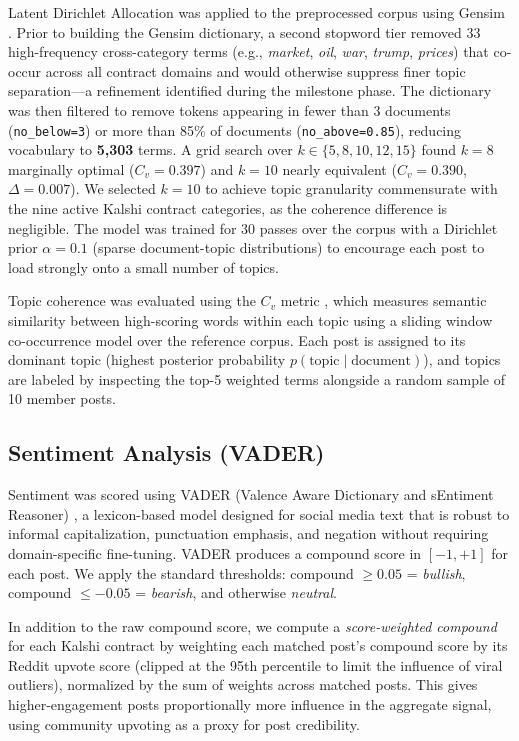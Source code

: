 \documentclass[sigconf]{acmart}
\begin{document}
Latent Dirichlet Allocation was applied to the preprocessed corpus using Gensim \cite{rehurek2010gensim}. Prior to building the Gensim dictionary, a second stopword tier removed 33 high-frequency cross-category terms (e.g., \textit{market}, \textit{oil}, \textit{war}, \textit{trump}, \textit{prices}) that co-occur across all contract domains and would otherwise suppress finer topic separation---a refinement identified during the milestone phase. The dictionary was then filtered to remove tokens appearing in fewer than 3 documents (\texttt{no\_below=3}) or more than 85\% of documents (\texttt{no\_above=0.85}), reducing vocabulary to \textbf{5,303} terms. A grid search over $k \in \{5, 8, 10, 12, 15\}$ found $k=8$ marginally optimal ($C_v = 0.397$) and $k=10$ nearly equivalent ($C_v = 0.390$, $\Delta = 0.007$). We selected $k=10$ to achieve topic granularity commensurate with the nine active Kalshi contract categories, as the coherence difference is negligible. The model was trained for 30 passes over the corpus with a Dirichlet prior $\alpha = 0.1$ (sparse document-topic distributions) to encourage each post to load strongly onto a small number of topics.

Topic coherence was evaluated using the $C_v$ metric \cite{roder2015coherence}, which measures semantic similarity between high-scoring words within each topic using a sliding window co-occurrence model over the reference corpus. Each post is assigned to its dominant topic (highest posterior probability $p(\text{topic} \mid \text{document})$), and topics are labeled by inspecting the top-5 weighted terms alongside a random sample of 10 member posts.

\subsection{Sentiment Analysis (VADER)}

Sentiment was scored using VADER (Valence Aware Dictionary and sEntiment Reasoner) \cite{hutto2014vader}, a lexicon-based model designed for social media text that is robust to informal capitalization, punctuation emphasis, and negation without requiring domain-specific fine-tuning. VADER produces a compound score in $[-1, +1]$ for each post. We apply the standard thresholds: compound $\geq 0.05$ = \textit{bullish}, compound $\leq -0.05$ = \textit{bearish}, and otherwise \textit{neutral}.

In addition to the raw compound score, we compute a \textit{score-weighted compound} for each Kalshi contract by weighting each matched post's compound score by its Reddit upvote score (clipped at the 95th percentile to limit the influence of viral outliers), normalized by the sum of weights across matched posts. This gives higher-engagement posts proportionally more influence in the aggregate signal, using community upvoting as a proxy for post credibility.
\end{document}
